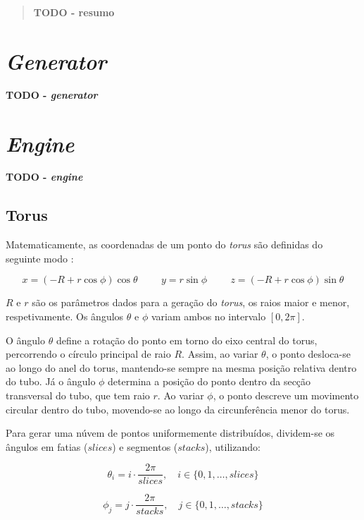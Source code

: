 \documentclass[12pt, a4paper]{article}
\begin{document}
\pagebreak

\begin{abstract}
    \textbf{\color{red} TODO - resumo}
\end{abstract}

\section{\emph{Generator}}

\textbf{\color{red} TODO - \emph{generator}}

\section{\emph{Engine}}

\textbf{\color{red} TODO - \emph{engine}}

\subsection{Torus}

Matematicamente, as coordenadas de um ponto do \emph{torus} são definidas do seguinte modo
\cite{torus}:

$$
x = (-R + r \cos \phi) \cos \theta
\hspace{1cm}
y = r \sin \phi
\hspace{1cm}
z = (-R + r \cos \phi) \sin \theta
$$

$R$ e $r$ são os parâmetros dados para a geração do \emph{torus}, os raios maior e menor,
respetivamente. Os ângulos $\theta$ e $\phi$ variam ambos no intervalo $[0, 2\pi]$.

O ângulo $\theta$ define a rotação do ponto em torno do eixo central do torus, percorrendo o
círculo principal de raio $R$. Assim, ao variar $\theta$, o ponto desloca-se ao longo do anel do
torus, mantendo-se sempre na mesma posição relativa dentro do tubo. Já o ângulo $\phi$ determina a
posição do ponto dentro da secção transversal do tubo, que tem raio $r$. Ao variar $\phi$, o ponto
descreve um movimento circular dentro do tubo, movendo-se ao longo da circunferência menor do torus.

Para gerar uma núvem de pontos uniformemente distribuídos, dividem-se os ângulos em fatias
($slices$) e segmentos ($stacks$), utilizando:

$$
\theta_i = i \cdot \frac{2\pi}{slices}, \quad i \in \{0, 1, \ldots, slices\}
$$

$$
\phi_j = j \cdot \frac{2\pi}{stacks}, \quad j \in \{0, 1, \ldots, stacks\}
$$
\end{document}
